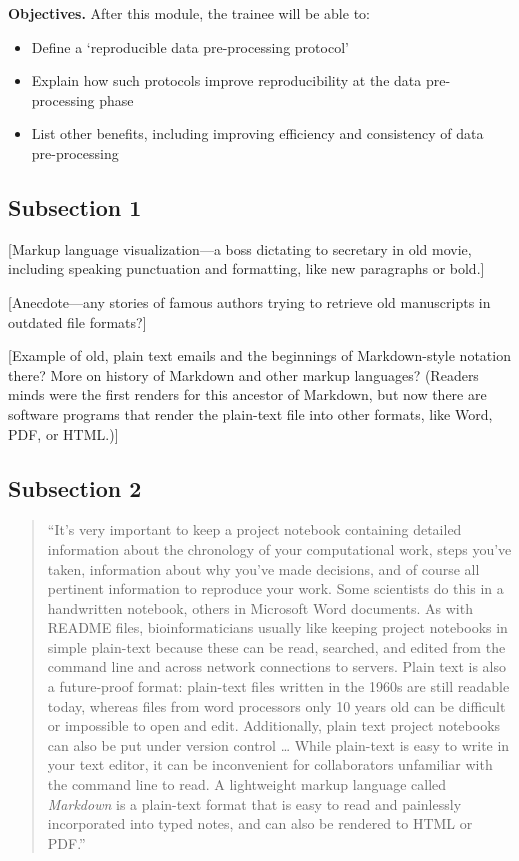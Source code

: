 \documentclass[]{tufte-book}
\providecommand{\tightlist}{%
  \setlength{\itemsep}{0pt}\setlength{\parskip}{0pt}}
\begin{document}
\textbf{Objectives.} After this module, the trainee will be able to:

\begin{itemize}
\tightlist
\item
  Define a `reproducible data pre-processing protocol'
\item
  Explain how such protocols improve reproducibility at the data pre-processing
  phase
\item
  List other benefits, including improving efficiency and consistency of data
  pre-processing
\end{itemize}

\hypertarget{subsection-1}{%
\subsection{Subsection 1}\label{subsection-1}}

{[}Markup language visualization---a boss dictating to secretary in old movie, including
speaking punctuation and formatting, like new paragraphs or bold.{]}

{[}Anecdote---any stories of famous authors trying to retrieve old manuscripts in
outdated file formats?{]}

{[}Example of old, plain text emails and the beginnings of Markdown-style notation
there? More on history of Markdown and other markup languages? (Readers minds were the
first renders for this ancestor of Markdown, but now there are software programs
that render the plain-text file into other formats, like Word, PDF, or HTML.){]}

\hypertarget{subsection-2}{%
\subsection{Subsection 2}\label{subsection-2}}

\begin{quote}
``It's very important to keep a project notebook containing detailed information
about the chronology of your computational work, steps you've taken, information
about why you've made decisions, and of course all pertinent information to
reproduce your work. Some scientists do this in a handwritten notebook, others in
Microsoft Word documents. As with README files, bioinformaticians usually like keeping
project notebooks in simple plain-text because these can be read, searched, and
edited from the command line and across network connections to servers. Plain text
is also a future-proof format: plain-text files written in the 1960s are still
readable today, whereas files from word processors only 10 years old can be
difficult or impossible to open and edit. Additionally, plain text project notebooks can
also be put under version control \ldots{} While plain-text is easy to write in your
text editor, it can be inconvenient for collaborators unfamiliar with the command
line to read. A lightweight markup language called \emph{Markdown} is a plain-text format
that is easy to read and painlessly incorporated into typed notes, and can also be
rendered to HTML or PDF.'' \citep{buffalo2015bioinformatics}
\end{quote}
\end{document}
